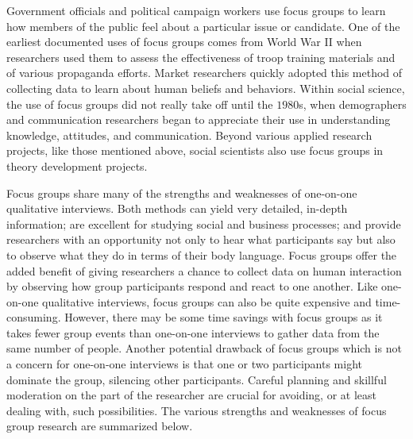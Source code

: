 Government officials and political campaign workers use focus groups to learn how members of the public feel about a particular issue or candidate. One of the earliest documented uses of focus groups comes from World War II when researchers used them to assess the effectiveness of troop training materials and of various propaganda efforts\cite{merton1946focused}. Market researchers quickly adopted this method of collecting data to learn about human beliefs and behaviors. Within social science, the use of focus groups did not really take off until the $ 1980 $s, when demographers and communication researchers began to appreciate their use in understanding knowledge, attitudes, and communication. Beyond various applied research projects, like those mentioned above, social scientists also use focus groups in theory development projects. 

Focus groups share many of the strengths and weaknesses of one-on-one qualitative interviews. Both methods can yield very detailed, in-depth information; are excellent for studying social and business processes; and provide researchers with an opportunity not only to hear what participants say but also to observe what they do in terms of their body language. Focus groups offer the added benefit of giving researchers a chance to collect data on human interaction by observing how group participants respond and react to one another. Like one-on-one qualitative interviews, focus groups can also be quite expensive and time-consuming. However, there may be some time savings with focus groups as it takes fewer group events than one-on-one interviews to gather data from the same number of people. Another potential drawback of focus groups which is not a concern for one-on-one interviews is that one or two participants might dominate the group, silencing other participants. Careful planning and skillful moderation on the part of the researcher are crucial for avoiding, or at least dealing with, such possibilities. The various strengths and weaknesses of focus group research are summarized below.

